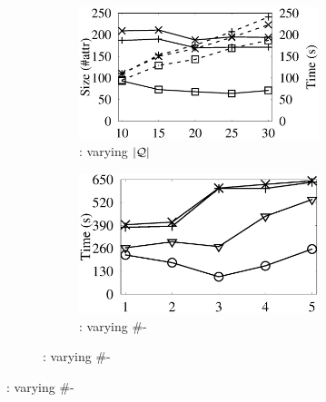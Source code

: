 \begin{figure}[tb!]
\begin{subfigure}[b]{1.00\textwidth}
        \begin{subfigure}[b]{0.271\textwidth}
			\centering
			\includegraphics[width=1\textwidth]{fig/vary_q_tpcds.eps}
			\begin{center}
				\vspace{-2ex}\caption{\tpcds: varying $|\mathcal Q|$}
				\label{tpcds-1-varyQ} 
			\end{center}
			\vspace{-1ex}
        \end{subfigure}
        \hspace{-3ex}
        \begin{subfigure}[b]{0.256\textwidth}
          \centering
          \includegraphics[width=1\textwidth]{fig/vary_j_tpch.eps}
          \begin{center}
            \vspace{-2ex}\caption{\tpcds: varying \#-}
            \label{tpcds-1-vary-join} 
          \end{center}
          \vspace{-1ex}
        \end{subfigure}
         \hspace{-2.8ex}

\end{subfigure}
\end{figure}
